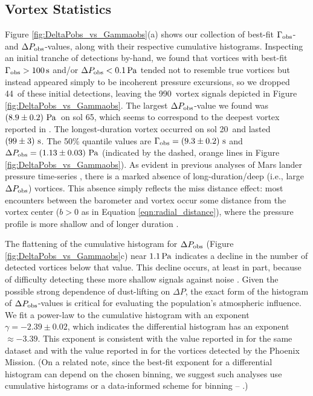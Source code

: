 \documentclass{aastex63}
\newcommand{\totalvortices}{990}
\newcommand{\maskedvortices}{44}
\newcommand{\largestDeltaPobs}{$\left( 8.9 \pm 0.2 \right)\,{\rm Pa}$}
\newcommand{\largestDeltaPobssol}{65}
\newcommand{\largestGammaobssol}{20}
\newcommand{\largestGammaobs}{$\left( 99 \pm 3 \right)\,{\rm s}$}
\begin{document}
\subsection{Vortex Statistics}
\label{sec:Vortex Statistics}
Figure \ref{fig:DeltaPobs_vs_Gammaobs}(a) shows our collection of best-fit $\Gamma_{\rm obs}$- and $\Delta P_{\rm obs}$-values, along with their respective cumulative histograms. Inspecting an initial tranche of detections by-hand, we found that vortices with best-fit $\Gamma_{\rm obs} > 100\,{\rm s}$ and/or $\Delta P_{\rm obs} < 0.1\,{\rm Pa}$ tended not to resemble true vortices but instead appeared simply to be incoherent pressure excursions, so we dropped \maskedvortices\ of these initial detections, leaving the \totalvortices\ vortex signals depicted in Figure \ref{fig:DeltaPobs_vs_Gammaobs}. The largest $\Delta P_{\rm obs}$-value we found was \largestDeltaPobs\ on sol \largestDeltaPobssol, which seems to correspond to the deepest vortex reported in \citet{2020arXiv200501134S}. The longest-duration vortex occurred on sol \largestGammaobssol\ and lasted \largestGammaobs. The 50\% quantile values are $\Gamma_{\rm obs} = \left( 9.3 \pm 0.2 \right)\,{\rm s}$ and $\Delta P_{\rm obs} = \left( 1.13 \pm 0.03 \right)\,{\rm Pa}$ (indicated by the dashed, orange lines in Figure \ref{fig:DeltaPobs_vs_Gammaobs}). As evident in previous analyses of Mars lander pressure time-series \citep[e.g.,][]{2010JGRE..115.0E16E}, there is a marked absence of long-duration/deep (i.e., large $\Delta P_{\rm obs}$) vortices. This absence simply reflects the miss distance effect: most encounters between the barometer and vortex occur some distance from the vortex center ($b > 0$ as in Equation \ref{eqn:radial_distance}), where the pressure profile is more shallow and of longer duration \citep{2018Icar..299..166J}.

The flattening of the cumulative histogram for $\Delta P_{\rm obs}$ (Figure \ref{fig:DeltaPobs_vs_Gammaobs}c) near $1.1\,{\rm Pa}$ indicates a decline in the number of detected vortices below that value. This decline occurs, at least in part, because of difficulty detecting these more shallow signals against noise \citep{2018Icar..299..166J}. Given the possible strong dependence of dust-lifting on $\Delta P$, the exact form of the histogram of $\Delta P_{\rm obs}$-values is critical for evaluating the population's atmospheric influence. We fit a power-law to the cumulative histogram with an exponent $\gamma = -2.39\pm0.02$, which indicates the differential histogram has an exponent $\approx -3.39$. This exponent is consistent with the value reported in \citet{2020arXiv200501134S} for the same dataset and with the value reported in \citet{2018Icar..299..166J} for the vortices detected by the Phoenix Mission. (On a related note, since the best-fit exponent for a differential histogram can depend on the chosen binning, we suggest such analyses use cumulative histograms or a data-informed scheme for binning -- \citealp{2016SSRv..203..277L}.)
\end{document}
